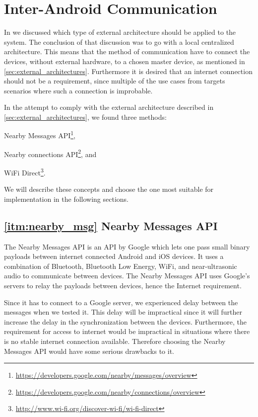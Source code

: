 \section{Inter-Android Communication}\label{sec:communication_methods}
In  we discussed which type of external architecture should be applied to the system.
The conclusion of that discussion was to go with a local centralized architecture.
This means that the method of communication have to connect the devices, without external hardware, to a chosen master device, as mentioned in \cref{sec:external_architectures}.
Furthermore it is desired that an internet connection should not be a requirement, since multiple of the use cases from  targets scenarios where such a connection is improbable.

In the attempt to comply with the external architecture described in \cref{sec:external_architectures}, we found three methods:
\begin{enumberate*}
\item Nearby Messages API\footnote{\url{https://developers.google.com/nearby/messages/overview}},\label{itm:nearby_msg}
\item Nearby connections API\footnote{\url{https://developers.google.com/nearby/connections/overview}}, and\label{itm:nearby_conn}
\item WiFi Direct\footnote{\url{http://www.wi-fi.org/discover-wi-fi/wi-fi-direct}}.\label{itm:wifi_direct}
\end{enumberate*}
We will describe these concepts and choose the one most suitable for implementation in the following sections.

\subsection*{\ref{itm:nearby_msg} Nearby Messages API}
The Nearby Messages API is an API by Google which lets one pass small binary payloads between internet connected Android and iOS devices.
It uses a combination of Bluetooth, Bluetooth Low Energy, WiFi, and near-ultrasonic audio to communicate between devices.
The Nearby Messages API uses Google's servers to relay the payloads between devices, hence the Internet requirement.\cite{nearby_messages}

Since it has to connect to a Google server, we experienced delay between the messages when we tested it.
This delay will be impractical since it will further increase the delay in the synchronization between the devices.
Furthermore, the requirement for access to internet would be impractical in situations where there is no stable internet connection available.
Therefore choosing the Nearby Messages API would have some serious drawbacks to it.

